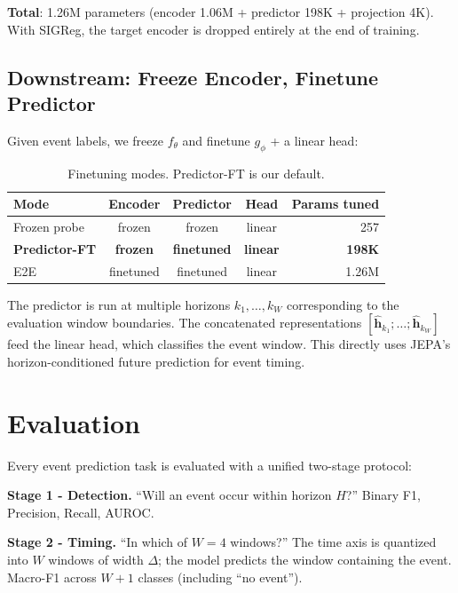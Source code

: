 \documentclass{article}
\newcommand{\h}{\mathbf{h}}
\newcommand{\encoder}{f_\theta}
\newcommand{\predictor}{g_\phi}
\begin{document}
\textbf{Total}: 1.26M parameters (encoder 1.06M + predictor 198K + projection 4K). With SIGReg, the target encoder is dropped entirely at the end of training.

\subsection{Downstream: Freeze Encoder, Finetune Predictor}
\label{sec:downstream}

Given event labels, we freeze $\encoder$ and finetune $\predictor$ + a linear head:

\begin{table}[h]
\centering
\caption{Finetuning modes. Predictor-FT is our default.}
\label{tab:finetune_modes}
\small
\begin{tabular}{@{}lcccr@{}}
\toprule
Mode & Encoder & Predictor & Head & Params tuned \\
\midrule
Frozen probe & frozen & frozen & linear & 257 \\
\textbf{Predictor-FT} & \textbf{frozen} & \textbf{finetuned} & \textbf{linear} & \textbf{198K} \\
E2E & finetuned & finetuned & linear & 1.26M \\
\bottomrule
\end{tabular}
\end{table}

The predictor is run at multiple horizons $k_1, \ldots, k_W$ corresponding to the evaluation window boundaries. The concatenated representations $[\hat{\h}_{k_1}; \ldots; \hat{\h}_{k_W}]$ feed the linear head, which classifies the event window. This directly uses JEPA's horizon-conditioned future prediction for event timing.

\section{Evaluation}
\label{sec:metrics}

Every event prediction task is evaluated with a unified two-stage protocol:

\textbf{Stage 1 - Detection.} ``Will an event occur within horizon $H$?'' Binary F1, Precision, Recall, AUROC.

\textbf{Stage 2 - Timing.} ``In which of $W{=}4$ windows?'' The time axis is quantized into $W$ windows of width $\Delta$; the model predicts the window containing the event. Macro-F1 across $W{+}1$ classes (including ``no event'').
\end{document}
